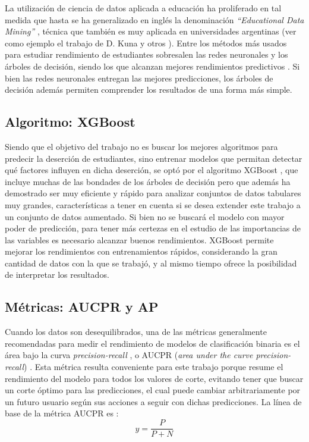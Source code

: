 \documentclass[a4paper,11pt,dvipsnames]{article}
\begin{document}
La utilización de ciencia de datos aplicada a educación ha proliferado en tal medida que hasta se ha generalizado en inglés la denominación \textit{``Educational Data Mining''} \cite{Romero5524021}, técnica que también es muy aplicada en universidades argentinas (ver como ejemplo el trabajo de D. Kuna y otros \cite{kuna:abandono}). Entre los métodos más usados para estudiar rendimiento de estudiantes sobresalen las redes neuronales y los árboles de decisión, siendo los que alcanzan mejores rendimientos predictivos \cite{SHAHIRI2015414}. Si bien las redes neuronales entregan las mejores predicciones, los árboles de decisión además permiten comprender los resultados de una forma más simple.

\subsection{Algoritmo: XGBoost}

Siendo que el objetivo del trabajo no es buscar los mejores algoritmos para predecir la deserción de estudiantes, sino entrenar modelos que permitan detectar qué factores influyen en dicha deserción, se optó por el algoritmo XGBoost \cite{Chen:2016:XST:2939672.2939785}, que incluye muchas de las bondades de los árboles de decisión pero que además ha demostrado ser muy eficiente y rápido para analizar conjuntos de datos tabulares muy grandes, características a tener en cuenta si se desea extender este trabajo a un conjunto de datos aumentado. Si bien no se buscará el modelo con mayor poder de predicción, para tener más certezas en el estudio de las importancias de las variables es necesario alcanzar buenos rendimientos. XGBoost permite mejorar los rendimientos con entrenamientos rápidos, considerando la gran cantidad de datos con la que se trabajó, y al mismo tiempo ofrece la posibilidad de interpretar los resultados.

\subsection{Métricas: AUCPR y AP}

Cuando los datos son desequilibrados, una de las métricas generalmente recomendadas para medir el rendimiento de modelos de clasificación binaria es el área bajo la curva \textit{precision-recall} , o AUCPR (\textit{area under the curve precision-recall}) \cite{Davis:AUC-PR}. Esta métrica resulta conveniente para este trabajo porque resume el rendimiento del modelo para todos los valores de corte, evitando tener que buscar un corte óptimo para las predicciones, el cual puede cambiar arbitrariamente por un futuro usuario según sus acciones a seguir con dichas predicciones. La línea de base de la métrica AUCPR es \cite{Saito:AUCPR}:
\begin{equation}\label{eq:base}
    y = \dfrac{P}{P+N}
\end{equation}
\end{document}
